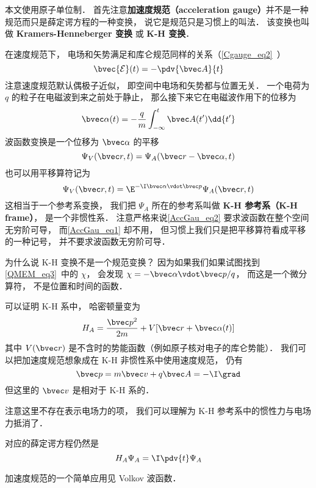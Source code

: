 

本文使用原子单位制． 首先注意\textbf{加速度规范（acceleration gauge）}并不是一种规范而只是薛定谔方程的一种变换， 说它是规范只是习惯上的叫法． 该变换也叫做 \textbf{Kramers-Henneberger 变换} 或 \textbf{K-H 变换}．

在速度规范下， 电场和矢势满足和库仑规范同样的关系（\autoref{Cgauge_eq2}~）
\begin{equation}
\bvec {\mathcal{E}}(t) = -\pdv{\bvec A}{t}
\end{equation}
注意速度规范默认偶极子近似， 即空间中电场和矢势都与位置无关． 一个电荷为 $q$ 的粒子在电磁波到来之前处于静止， 那么接下来它在电磁波作用下的位移为
\begin{equation}\label{AccGau_eq3}
\bvec \alpha(t) = -\frac{q}{m}\int_{-\infty}^t \bvec A(t') \dd{t'}
\end{equation}
波函数变换是一个位移为 $\bvec \alpha$ 的平移
\begin{equation}\label{AccGau_eq1}
\Psi_V(\bvec r, t) = \Psi_A(\bvec r - \bvec \alpha, t)
\end{equation}
也可以用平移算符记为
\begin{equation}\label{AccGau_eq2}
\Psi_V(\bvec r, t) = \E^{-\I \bvec \alpha \vdot \bvec p} \Psi_A(\bvec r, t)
\end{equation}
这相当于一个参考系变换， 我们把 $\Psi_A$ 所在的参考系叫做 \textbf{K-H 参考系（K-H frame）}， 是一个非惯性系． 注意严格来说\autoref{AccGau_eq2} 要求波函数在整个空间无穷阶可导， 而\autoref{AccGau_eq1} 却不用， 但习惯上我们只是把平移算符看成平移的一种记号， 并不要求波函数无穷阶可导．

为什么说 K-H 变换不是一个规范变换？ 因为如果我们如果试图找到\autoref{QMEM_eq3}~中的 $\chi$， 会发现 $\chi = -\bvec \alpha \vdot \bvec p/q$， 而这是一个微分算符， 不是位置和时间的函数．

可以证明 K-H 系中， 哈密顿量变为
\begin{equation}
H_A = \frac{\bvec p^2}{2m} + V[\bvec r + \bvec \alpha(t)]
\end{equation}
其中 $V(\bvec r)$ 是不含时的势能函数（例如原子核对电子的库仑势能）． 我们可以把加速度规范想象成在 K-H 非惯性系中使用速度规范， 仍有
\begin{equation}
\bvec p = m\bvec v + q\bvec A = -\I \grad
\end{equation}
但这里的 $\bvec v$ 是相对于 K-H 系的．

注意这里不存在表示电场力的项， 我们可以理解为 K-H 参考系中的惯性力与电场力抵消了．

对应的薛定谔方程仍然是
\begin{equation}\label{AccGau_eq4}
H_A \Psi_A = \I \pdv{t} \Psi_A
\end{equation}

加速度规范的一个简单应用见 Volkov 波函数．

